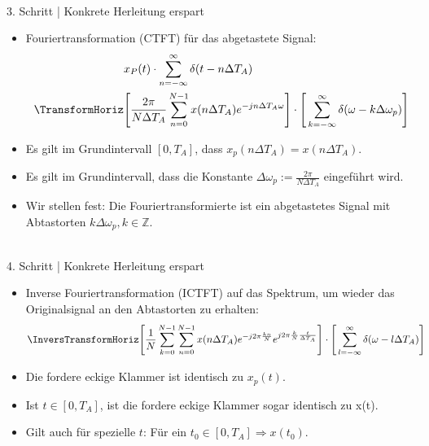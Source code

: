 \documentclass[12pt,a4paper]{scrartcl}
\begin{document}
\noindent \\ 3. Schritt | Konkrete Herleitung erspart
 \begin{itemize}
  \item Fouriertransformation (CTFT) für das abgetastete Signal: \begin{equation}
    \label{eq:19}
    \begin{split}
      & x_P (t) \cdot \sum_{n = -\infty}^{\infty} \delta(t - n \Delta T_A) \\
      \TransformHoriz & \Bigg[ \frac{2\pi}{N \Delta T_A} \sum_{n = 0}^{N -1} x(n \Delta T_A) e^{- j n\Delta T_A \omega} \Bigg] \cdot \Bigg[\sum_{k = -\infty}^{\infty} \delta(\omega - k\Delta \omega_p) \Bigg]
    \end{split}
  \end{equation}
  \item Es gilt im Grundintervall $[0, T_A]$, dass $x_p(n\Delta T_A) = x(n \Delta T_A)$.
  \item Es gilt im Grundintervall, dass die Konstante $\Delta \omega_p := \frac{2\pi}{N \Delta T_A}$ eingeführt wird.
  \item Wir stellen fest: Die Fouriertransformierte ist ein abgetastetes Signal mit Abtastorten $k\Delta\omega_p, k \in \mathbb{Z}$.
\end{itemize}

\noindent \\ 4. Schritt | Konkrete Herleitung erspart
 \begin{itemize}
  \item Inverse Fouriertransformation (ICTFT) auf das Spektrum, um wieder das Originalsignal an den Abtastorten zu erhalten: \begin{equation}
    \label{eq:20}
    \begin{split}
      \InversTransformHoriz & \Bigg[ \frac{1}{N} \sum_{k = 0}^{N -1} \sum_{n = 0}^{N -1}  x(n \Delta T_A) e^{- j 2\pi \frac{k n}{N}}e^{j2\pi \frac{k}{N} \frac{t}{\Delta T_A}} \Bigg] \cdot \Bigg[\sum_{l = -\infty}^{\infty} \delta(\omega - l\Delta T_A) \Bigg]
    \end{split}
  \end{equation}
  \item Die fordere eckige Klammer ist identisch zu $x_p(t)$.
  \item Ist $t \in [0,T_A]$, ist die fordere eckige Klammer sogar identisch zu x(t).
  \item Gilt auch für spezielle $t$: Für ein $t_0 \in [0,T_A] \Rightarrow x(t_0)$.
\end{itemize}
\end{document}
